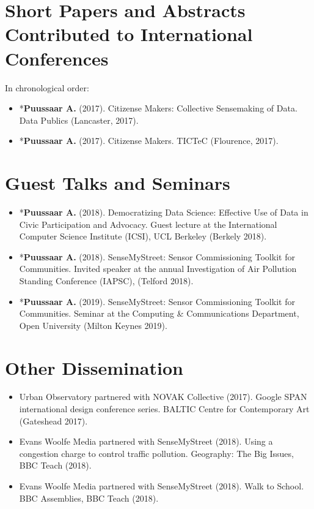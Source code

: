 \section*{Short Papers and Abstracts Contributed to International Conferences}
In chronological order:
\begin{itemize}
\item *\textbf{Puussaar A.} (2017). Citizense Makers: Collective Sensemaking of Data. Data Publics (Lancaster, 2017).
\item *\textbf{Puussaar A.} (2017). Citizense Makers. TICTeC (Flourence, 2017).
\end{itemize}

\section*{Guest Talks and Seminars}
\begin{itemize}
\item *\textbf{Puussaar A.} (2018). Democratizing Data Science: Effective Use of Data in Civic Participation and Advocacy. Guest lecture at the International Computer Science Institute (ICSI), UCL Berkeley (Berkely 2018).
\item *\textbf{Puussaar A.} (2018). SenseMyStreet: Sensor Commissioning Toolkit for Communities. Invited speaker at the annual Investigation of Air Pollution Standing Conference (IAPSC), (Telford 2018).
\item *\textbf{Puussaar A.} (2019). SenseMyStreet: Sensor Commissioning Toolkit for Communities. Seminar at the Computing \& Communications Department, Open University (Milton Keynes 2019).
\end{itemize}

\section*{Other Dissemination}
\begin{itemize}
    \item Urban Observatory partnered with NOVAK Collective (2017). Google SPAN international design conference series. BALTIC Centre for Contemporary Art (Gateshead 2017).
    \item Evans Woolfe Media partnered with SenseMyStreet (2018). Using a congestion charge to control traffic pollution. Geography: The Big Issues, BBC Teach (2018).
    \item Evans Woolfe Media partnered with SenseMyStreet (2018). Walk to School. BBC Assemblies, BBC Teach (2018).
\end{itemize}

